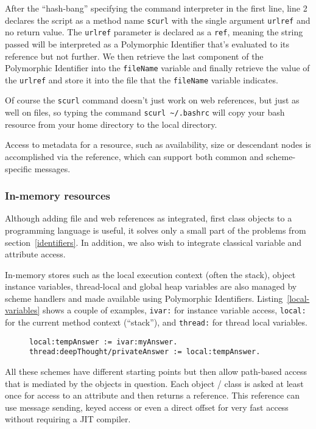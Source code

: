 \documentclass[preprint,authoryear]{llncs}
\begin{document}
After the ``hash-bang'' specifying the command interpreter in the first line, line 2 declares
the script as a method name {\tt scurl} with the single argument {\tt urlref} and no return
value.  The {\tt urlref} parameter is declared as a {\tt ref}, meaning the string passed will
be interpreted as a Polymorphic Identifier that's evaluated to its reference but not further.
We then retrieve the last component of the Polymorphic Identifier into the {\tt fileName}
variable and finally retrieve the value of the {\tt urlref} and store it into the file that
the {\tt fileName} variable indicates.

Of course the {\tt scurl} command doesn't just work on web references, but just as well
on files, so typing the command {\tt scurl \~\//.bashrc} will copy your bash resource from your home directory
to the local directory.

Access to metadata for a resource, such as availability, size or descendant nodes
is accomplished via the reference, which can support both common and scheme-specific
messages.

\subsubsection{In-memory resources}
\label{inmemory}

Although adding file and web references as integrated, first class objects to a programming
language is useful, it solves only a small part of the problems from section~\ref{identifiers}.
In addition, we also wish to integrate classical variable and attribute access.

In-memory stores such as the local execution context (often the stack), object instance
variables, thread-local and global heap variables are also managed by scheme handlers
and made available using Polymorphic Identifiers.  Listing~\ref{local-variables} shows
a couple of examples, {\tt ivar:} for instance variable access, {\tt local:} for the current
method context (``stack''), and {\tt thread:} for thread local variables.

\begin{figure}[htbp]
\begin{lstlisting}[style=numbers,label=local-variables,caption=Different memory variables.]
local:tempAnswer := ivar:myAnswer.
thread:deepThought/privateAnswer := local:tempAnswer.
\end{lstlisting}
\end{figure}

All these schemes have different starting points but then allow path-based access
that is mediated by the objects in question.   Each object / class is asked at least
once for access to an attribute and then returns a reference.   This reference can
use message sending, keyed access or even a direct offset for very fast
access without requiring a JIT compiler.
\end{document}
